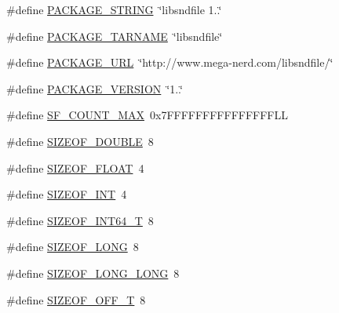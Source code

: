 \begin{DoxyCompactItemize}
\item 
\#define \hyperlink{mac_2config_2i386_2lib-src_2libsndfile_2src_2config_8h_ac73e6f903c16eca7710f92e36e1c6fbf}{P\+A\+C\+K\+A\+G\+E\+\_\+\+S\+T\+R\+I\+NG}~\char`\"{}libsndfile 1..\char`\"{}
\item 
\#define \hyperlink{mac_2config_2i386_2lib-src_2libsndfile_2src_2config_8h_af415af6bfede0e8d5453708afe68651c}{P\+A\+C\+K\+A\+G\+E\+\_\+\+T\+A\+R\+N\+A\+ME}~\char`\"{}libsndfile\char`\"{}
\item 
\#define \hyperlink{mac_2config_2i386_2lib-src_2libsndfile_2src_2config_8h_a5c93853116d5a50307b6744f147840aa}{P\+A\+C\+K\+A\+G\+E\+\_\+\+U\+RL}~\char`\"{}http\+://www.\+mega-\/nerd.\+com/libsndfile/\char`\"{}
\item 
\#define \hyperlink{mac_2config_2i386_2lib-src_2libsndfile_2src_2config_8h_aa326a05d5e30f9e9a4bb0b4469d5d0c0}{P\+A\+C\+K\+A\+G\+E\+\_\+\+V\+E\+R\+S\+I\+ON}~\char`\"{}1..\char`\"{}
\item 
\#define \hyperlink{mac_2config_2i386_2lib-src_2libsndfile_2src_2config_8h_a2a594c90b41e9b0140f28724f80b763a}{S\+F\+\_\+\+C\+O\+U\+N\+T\+\_\+\+M\+AX}~0x7\+F\+F\+F\+F\+F\+F\+F\+F\+F\+F\+F\+F\+F\+F\+F\+LL
\item 
\#define \hyperlink{mac_2config_2i386_2lib-src_2libsndfile_2src_2config_8h_a8409aaaf865dc14179cbe2a63bffbc7f}{S\+I\+Z\+E\+O\+F\+\_\+\+D\+O\+U\+B\+LE}~8
\item 
\#define \hyperlink{mac_2config_2i386_2lib-src_2libsndfile_2src_2config_8h_a0c4343d1f6e7b7ce4f470d9ea69ad0b4}{S\+I\+Z\+E\+O\+F\+\_\+\+F\+L\+O\+AT}~4
\item 
\#define \hyperlink{mac_2config_2i386_2lib-src_2libsndfile_2src_2config_8h_a44184cf844a916eee78598ab35fc966b}{S\+I\+Z\+E\+O\+F\+\_\+\+I\+NT}~4
\item 
\#define \hyperlink{mac_2config_2i386_2lib-src_2libsndfile_2src_2config_8h_a9ff3f52037bd863890b862d86fb9b6cf}{S\+I\+Z\+E\+O\+F\+\_\+\+I\+N\+T64\+\_\+T}~8
\item 
\#define \hyperlink{mac_2config_2i386_2lib-src_2libsndfile_2src_2config_8h_a22aece5d034fd9040a3d01c3797fdfe7}{S\+I\+Z\+E\+O\+F\+\_\+\+L\+O\+NG}~8
\item 
\#define \hyperlink{mac_2config_2i386_2lib-src_2libsndfile_2src_2config_8h_acd1ddb89a6f7f17d1c152499173c3eef}{S\+I\+Z\+E\+O\+F\+\_\+\+L\+O\+N\+G\+\_\+\+L\+O\+NG}~8
\item 
\#define \hyperlink{mac_2config_2i386_2lib-src_2libsndfile_2src_2config_8h_a92a3775c9835089677d63cd605ec1a7a}{S\+I\+Z\+E\+O\+F\+\_\+\+O\+F\+F\+\_\+T}~8

\end{DoxyCompactItemize}
